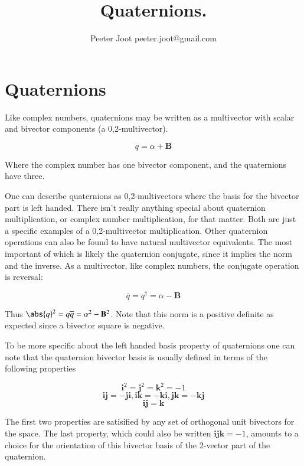 \documentclass{article}      %
\title{Quaternions.} %
\author{Peeter Joot \quad peeter.joot@gmail.com}         %
\begin{document}

\maketitle{}

\section{Quaternions}

Like complex numbers, quaternions may be written as a multivector with scalar and bivector components (a 0,2-multivector).

\[
q = \alpha + \mathbf{B}
\]

Where the complex number has one bivector component, and the quaternions have three.

One can describe quaternions as 0,2-multivectors where the basis for the bivector part is left handed.  There isn't really anything special about quaternion multiplication, or complex number multiplication, for that matter.  Both are just a specific examples of a 0,2-multivector multiplication.  Other quaternion operations can also be found to have natural multivector equivalents.  The most important of which is likely the quaternion conjugate, since it implies the norm and the inverse.  As a multivector, like complex numbers, the conjugate operation is reversal:

\[
\overline{q} = q^\dagger = \alpha - \mathbf{B}
\]

Thus $\abs{q}^2 = q\overline{q} = \alpha^2 - \mathbf{B}^2$.  Note that this norm is a positive definite as expected since a bivector square is negative.

To be more specific about the left handed basis property of quaternions one can note that the quaternion bivector basis is usually defined in terms of the following properties

\[
\mathbf{i}^2 = \mathbf{j}^2 = \mathbf{k}^2 = -1
\]
\[
\mathbf{i}\mathbf{j} = -\mathbf{j}\mathbf{i}, \mathbf{i}\mathbf{k} = -\mathbf{k}\mathbf{i}, \mathbf{j}\mathbf{k} = -\mathbf{k}\mathbf{j}
\]
\[
\mathbf{i}\mathbf{j} = \mathbf{k}
\]

The first two properties are satisified by any set of orthogonal unit bivectors for the space.  The last property, which could also be written $\mathbf{i}\mathbf{j}\mathbf{k} = -1$, amounts to a choice for the orientation of this bivector basis of the 2-vector part of the quaternion.
\end{document}
